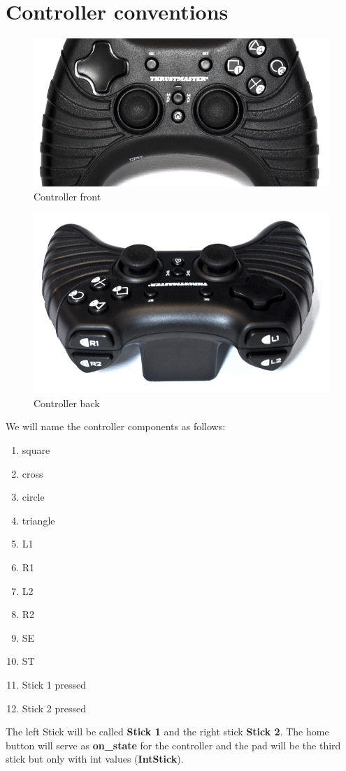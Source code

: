 \documentclass[letterpaper, openright, 11pt]{article}
\begin{document}
\section{Controller conventions}

\begin{figure}[H]
	\centering
	\includegraphics[scale=0.6]{cont-front.jpg}
	\caption{Controller front}
\end{figure}

\begin{figure}[H]
	\centering
	\includegraphics[scale=0.4]{cont-back.jpg}
	\caption{Controller back}
\end{figure}
We will name the controller components as follows:
\begin{multicols}{4}
\begin{enumerate}
\item square
\item cross
\item circle
\item triangle
\item L1
\item R1
\item L2
\item R2
\item SE
\item ST
\item Stick 1 pressed
\item Stick 2 pressed
\end{enumerate}
\end{multicols}
The left Stick will be called \textbf{Stick 1} and the right stick \textbf{Stick 2}. The home button will serve as \textbf{on\_state} for the controller and the pad will be the third stick but only with int values (\textbf{IntStick}).
\end{document}
